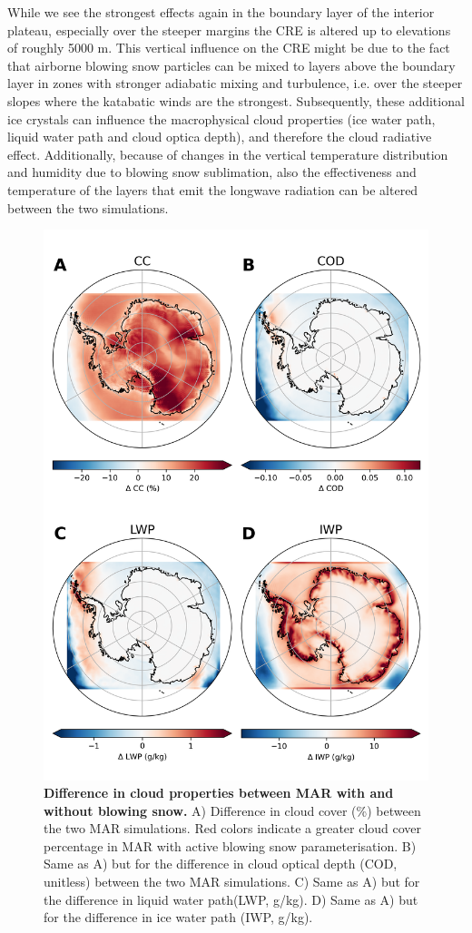 \documentclass[12pt]{article}
\begin{document}
While we see the strongest effects again in the boundary layer of the interior plateau, especially over the steeper margins the CRE is altered up to elevations of roughly 5000 m. This vertical influence on the CRE might be due to the fact that airborne blowing snow particles can be mixed to layers above the boundary layer in zones with stronger adiabatic mixing and turbulence, i.e. over the steeper slopes where the katabatic winds are the strongest. Subsequently, these additional ice crystals can influence the macrophysical cloud properties (ice water path, liquid water path and cloud optica depth), and therefore the cloud radiative effect. Additionally, because of changes in the vertical temperature distribution and humidity due to blowing snow sublimation, also the effectiveness and temperature of the layers that emit the longwave radiation can be altered between the two simulations. 
\begin{figure}[H]
	\includegraphics[scale=0.7,center]{microphysics.png}
	\caption{\textbf{Difference in cloud properties between MAR with and without blowing snow.} A) Difference in cloud cover (\%) between the two MAR simulations. Red colors indicate a greater cloud cover percentage in MAR with active blowing snow parameterisation. B) Same as A) but for the difference in cloud optical depth (COD, unitless) between the two MAR simulations. C) Same as A) but for the difference in liquid water path(LWP, g/kg). D) Same as A) but for the difference in ice water path (IWP, g/kg).}
	\label{fig:micro}
\end{figure}
\end{document}
